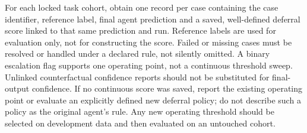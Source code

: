For each locked task cohort, obtain one record per case containing the case
identifier, reference label, final agent prediction and a saved, well-defined
deferral score linked to that same prediction and run. Reference labels are
used for evaluation only, not for constructing the score. Failed or missing
cases must be resolved or handled under a declared rule, not silently omitted.
A binary escalation flag supports one operating point, not a continuous
threshold sweep. Unlinked counterfactual confidence reports should not be
substituted for final-output confidence. If no continuous score was saved,
report the existing operating point or evaluate an explicitly defined new
deferral policy; do not describe such a policy as the original agent's rule.
Any new operating threshold should be selected on development data and then
evaluated on an untouched cohort.

